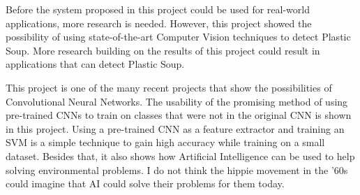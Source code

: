 Before the system proposed in this project could be used for real-world applications, more research is needed.
However, this project showed the possibility of using state-of-the-art Computer Vision techniques to detect Plastic Soup.
More research building on the results of this project could result in applications that can detect Plastic Soup.

This project is one of the many recent projects that show the possibilities of Convolutional Neural Networks.
The usability of the promising method of using pre-trained CNNs to train on classes that were not in the original CNN is shown in this project.
Using a pre-trained CNN as a feature extractor and training an SVM is a simple technique to gain high accuracy while training on a small dataset.
Besides that, it also shows how Artificial Intelligence can be used to help solving environmental problems.
I do not think the hippie movement in the '60s could imagine that AI could solve their problems for them today.






